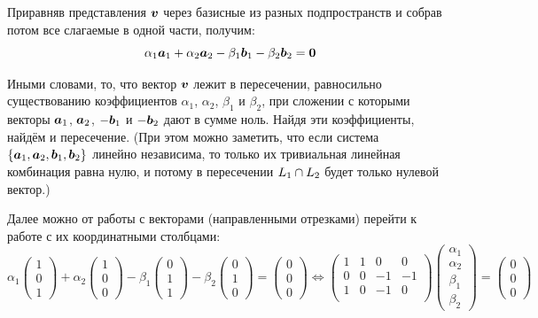 \documentclass[a4paper,12pt]{article}
\begin{document}
  Приравняв представления $\boldsymbol v$ через базисные из разных подпространств и собрав потом все слагаемые в одной части, получим:
  \[
    \alpha_1 \boldsymbol a_1 + \alpha_2 \boldsymbol a_2 - \beta_1 \boldsymbol b_1 - \beta_2 \boldsymbol b_2 = \boldsymbol 0
  \]
  
  Иными словами, то, что вектор $\boldsymbol v$ лежит в пересечении, равносильно существованию коэффициентов $\alpha_1$, $\alpha_2$, $\beta_1$ и $\beta_2$, при сложении с которыми векторы $\boldsymbol a_1$, $\boldsymbol a_2$, $-{\boldsymbol b_1}$ и $-{\boldsymbol b_2}$ дают в сумме ноль.
  Найдя эти коэффициенты, найдём и пересечение.
  (При этом можно заметить, что если система $\{\boldsymbol a_1, \boldsymbol a_2, \boldsymbol b_1, \boldsymbol b_2\}$ линейно независима, то только их тривиальная линейная комбинация равна нулю, и потому в пересечении $L_1 \hm\cap L_2$ будет только нулевой вектор.)
  
  Далее можно от работы с векторами (направленными отрезками) перейти к работе с их координатными столбцами:
  \[
    \alpha_1 \begin{pmatrix}
      1\\ 0\\ 1
    \end{pmatrix} + \alpha_2 \begin{pmatrix}
      1\\ 0\\ 0
    \end{pmatrix} - \beta_1 \begin{pmatrix}
      0\\ 1\\ 1
    \end{pmatrix} - \beta_2 \begin{pmatrix}
      0\\ 1\\ 0
    \end{pmatrix} = \begin{pmatrix}
      0\\ 0\\ 0
    \end{pmatrix}
    \Leftrightarrow \begin{pmatrix}
      1 & 1 &  0 &  0\\
      0 & 0 & -1 & -1\\
      1 & 0 & -1 &  0\\
    \end{pmatrix} \begin{pmatrix}
      \alpha_1\\ \alpha_2\\ \beta_1\\ \beta_2
    \end{pmatrix} = \begin{pmatrix}
      0\\ 0\\ 0
    \end{pmatrix}
  \]
\end{document}
